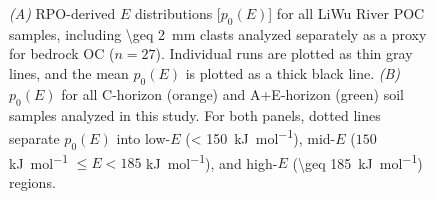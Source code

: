 \begin{figure}[p]
	\label{Ch6Fig:S2} 
\end{figure}

\begin{figure}[p]
	\caption[RPO $p_{0}(E)$ distributions for all samples analyzed]{\textit{(A)} RPO-derived $E$ distributions [$p_{0}(E)$] for all LiWu River POC samples, including \SI{\geq 2}{mm} clasts analyzed separately as a proxy for bedrock OC ($n = 27$). Individual runs are plotted as thin gray lines, and the mean $p_{0}(E)$ is plotted as a thick black line. \textit{(B)} $p_{0}(E)$ for all C-horizon (orange) and A+E-horizon (green) soil samples analyzed in this study. For both panels, dotted lines separate $p_{0}(E)$ into low-$E$ (\SI{< 150}{kJ.mol^{-1}}), mid-$E$ ($150$ \si{kJ.mol^{-1}} $\leq E < 185$ \si{kJ.mol^{-1}}), and high-$E$ (\SI{\geq 185}{kJ.mol^{-1}}) regions.}
	\label{Ch6Fig:S3} 
\end{figure}

\renewcommand\thefigure{\thechapter.\arabic{figure}}
